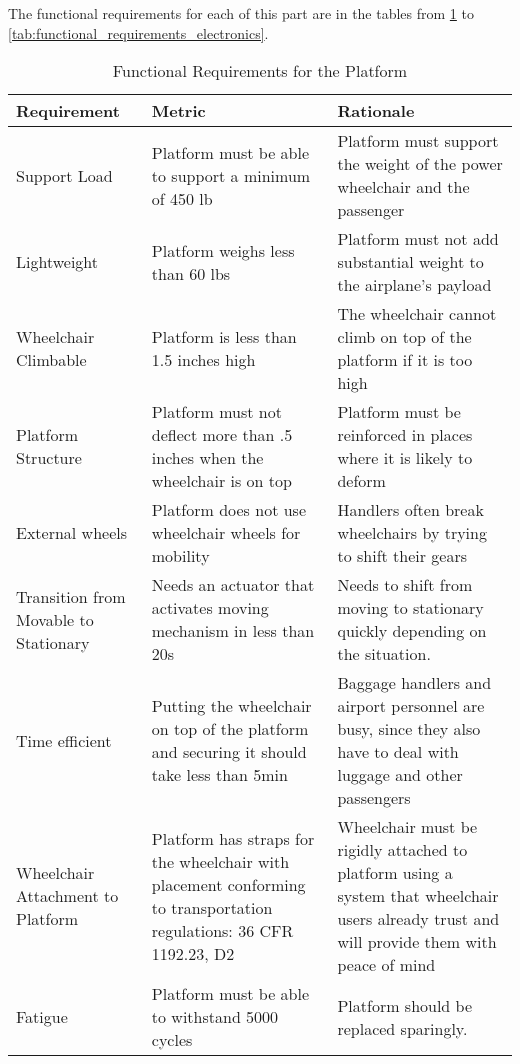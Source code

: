 The functional requirements for each of this part are in the tables from \ref{tab:functional_requirements_platform} to \ref{tab:functional_requirements_electronics}.

\newpage

\begin{table}
\begin{tabular} {| p{4cm} | p{5cm} | p{5cm} |}
\hline
\textbf{Requirement} & \textbf{Metric} & \textbf{Rationale} \\ \hline

Support Load & Platform must be able to support a minimum of 450 lb & Platform must support the weight of the power wheelchair and the passenger \\ \hline
Lightweight & Platform weighs less than 60 lbs & Platform must not add substantial weight to the airplane's payload \\ \hline
Wheelchair Climbable & Platform is less than 1.5 inches high & The wheelchair cannot climb on top of the platform if it is too high  \\ \hline
Platform Structure & Platform must not deflect more than .5 inches when the wheelchair is on top & Platform must be reinforced in places where it is likely to deform \\ \hline
External wheels & Platform does not use wheelchair wheels for mobility & Handlers often break wheelchairs by trying to shift their gears \\ \hline
Transition from Movable to Stationary & Needs an actuator that activates moving mechanism in less than 20s & Needs to shift from moving to stationary quickly depending on the situation.  \\ \hline
Time efficient & Putting the wheelchair on top of the platform and securing it should take less than 5min & Baggage handlers and airport personnel are busy, since they also have to deal with luggage and other passengers \\ \hline
Wheelchair Attachment to Platform & Platform has straps for the wheelchair with placement conforming to transportation regulations:  36 CFR 1192.23, D2
& Wheelchair must be rigidly attached to platform using a system that wheelchair users already trust and will provide them with peace of mind\\ \hline
Fatigue & Platform must be able to withstand 5000 cycles & Platform should be replaced sparingly. \\ \hline
\end{tabular} 
\caption{Functional Requirements for the Platform}
\label{tab:functional_requirements_platform}
\end{table}

